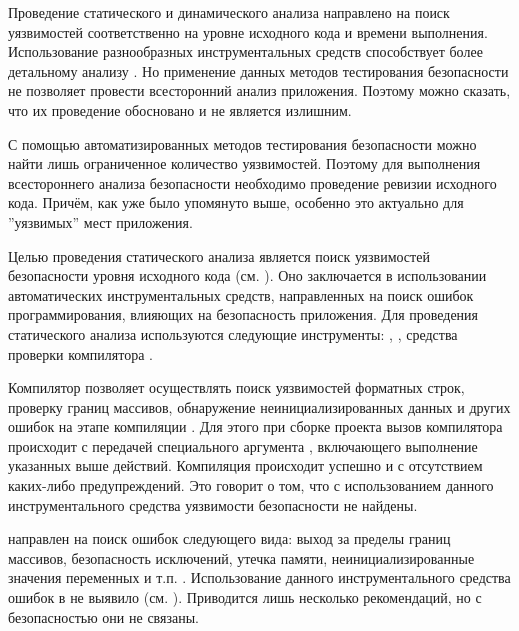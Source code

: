 %
Проведение статического и динамического анализа направлено на поиск уязвимостей соответственно на уровне исходного кода и времени выполнения. 
%
Использование разнообразных инструментальных средств способствует более детальному анализу \PeerHood. 
%
Но применение данных методов тестирования безопасности не позволяет провести всесторонний анализ приложения. 
%
Поэтому можно сказать, что их проведение обосновано и не является излишним.

%
С помощью автоматизированных методов тестирования безопасности можно найти лишь ограниченное количество уязвимостей. 
%
Поэтому для выполнения всестороннего анализа безопасности \PeerHood необходимо проведение ревизии исходного кода. 
%
Причём, как уже было упомянуто выше, особенно это актуально для ''уязвимых'' мест приложения. 



%
Целью проведения статического анализа является поиск уязвимостей безопасности уровня исходного кода (см. ). 
%
Оно заключается в использовании автоматических инструментальных средств, направленных на поиск ошибок программирования, влияющих на безопасность приложения. 
%
Для проведения статического анализа \PeerHood используются следующие инструменты: , , средства проверки компилятора . 

%
Компилятор  позволяет осуществлять поиск уязвимостей форматных строк, проверку границ массивов, обнаружение неинициализированных данных и других ошибок на этапе компиляции . 
%
Для этого при сборке проекта вызов компилятора происходит с передачей специального аргумента , включающего выполнение указанных выше действий. 
%
Компиляция \PeerHood происходит успешно и с отсутствием каких-либо предупреждений. 
%
Это говорит о том, что с использованием данного инструментального средства уязвимости безопасности не найдены. 

%
 направлен на поиск ошибок следующего вида: выход за пределы границ массивов, безопасность исключений, утечка памяти, неинициализированные значения переменных и т.п. . 
%
Использование данного инструментального средства ошибок в \PeerHood не выявило (см. ). 
%
Приводится лишь несколько рекомендаций, но с безопасностью они не связаны. 

